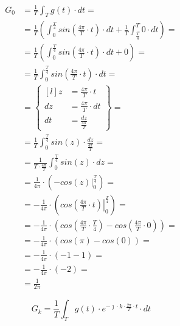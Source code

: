 \begin{task}
\begin{align*}
G_0&=\frac{1}{T}\int_{T}g(t) \cdot dt=\\
&=\frac{1}{T}\left(\int_{0}^{\frac{T}{4}}sin\left( \frac{4\pi}{T} \cdot t\right) \cdot dt 
+ \frac{1}{T}\int_{\frac{T}{4}}^{T}0 \cdot dt \right)=\\
&=\frac{1}{T}\left(\int_{0}^{\frac{T}{4}}sin\left( \frac{4\pi}{T} \cdot t\right) \cdot dt 
+ 0 \right)=\\
&=\frac{1}{T}\int_{0}^{\frac{T}{4}}sin\left( \frac{4\pi}{T} \cdot t\right) \cdot dt=\\
&=\begin{Bmatrix*}[l]
z&=\frac{4\pi}{T} \cdot t\\
dz&=\frac{4\pi}{T} \cdot dt\\
dt&=\frac{dz}{\frac{4\pi}{T}}
\end{Bmatrix*}=\\
&=\frac{1}{T}\int_{0}^{\frac{T}{4}}sin\left( z\right) \cdot \frac{dz}{\frac{4\pi}{T}}=\\
&=\frac{1}{T\cdot \frac{4\pi}{T}}\int_{0}^{\frac{T}{4}}sin\left( z\right) \cdot dz=\\
&=\frac{1}{4\pi}\cdot \left(\left . -cos\left( z\right) \right|_{0}^{\frac{T}{4}}\right)=\\
&=-\frac{1}{4\pi}\cdot \left(\left . cos\left( \frac{4\pi}{T} \cdot t\right) \right|_{0}^{\frac{T}{4}}\right)=\\
&=-\frac{1}{4\pi}\cdot \left( cos\left( \frac{4\pi}{T} \cdot \frac{T}{4}\right) - cos\left( \frac{4\pi}{T} \cdot 0\right)\right)=\\
&=-\frac{1}{4\pi}\cdot \left( cos\left(\pi\right) - cos\left( 0\right)\right)=\\
&=-\frac{1}{4\pi}\cdot \left( -1 - 1\right)=\\
&=-\frac{1}{4\pi}\cdot \left( -2\right)=\\
&=\frac{1}{2\pi}
\end{align*}



\begin{equation}
G_k=\frac{1}{T}\int_{T}g(t) \cdot e^{-\jmath \cdot k \cdot \frac{2\pi}{T} \cdot t} \cdot dt
\end{equation}



\end{task}
